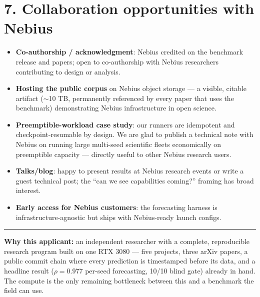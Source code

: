 \documentclass[11pt]{article}
\begin{document}
\section*{7. Collaboration opportunities with Nebius}

\begin{itemize}
\item \textbf{Co-authorship / acknowledgment}: Nebius credited on the benchmark release and
  papers; open to co-authorship with Nebius researchers contributing to design or analysis.
\item \textbf{Hosting the public corpus} on Nebius object storage --- a visible,
  citable artifact ($\sim$10 TB, permanently referenced by every paper that uses the
  benchmark) demonstrating Nebius infrastructure in open science.
\item \textbf{Preemptible-workload case study}: our runners are idempotent and
  checkpoint-resumable by design. We are glad to publish a technical note with Nebius on
  running large multi-seed scientific fleets economically on preemptible capacity ---
  directly useful to other Nebius research users.
\item \textbf{Talks/blog}: happy to present results at Nebius research events or write a
  guest technical post; the ``can we see capabilities coming?'' framing has broad interest.
\item \textbf{Early access for Nebius customers}: the forecasting harness is
  infrastructure-agnostic but ships with Nebius-ready launch configs.
\end{itemize}

\vspace{0.3cm}
\noindent\rule{\textwidth}{0.4pt}
\small
\textbf{Why this applicant:} an independent researcher with a complete, reproducible
research program built on one RTX 3080 --- five projects, three arXiv papers, a public
commit chain where every prediction is timestamped before its data, and a headline result
($\rho = 0.977$ per-seed forecasting, 10/10 blind gate) already in hand. The compute is the
only remaining bottleneck between this and a benchmark the field can use.
\end{document}
